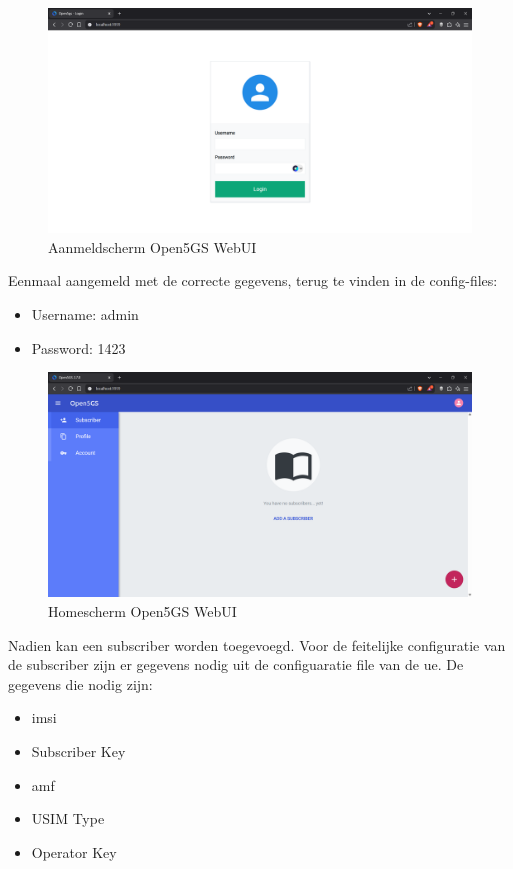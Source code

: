 \begin{figure}[h]
    \includegraphics[width=\linewidth]{../graphics/POC-WebUI-Login.png}
    \caption{Aanmeldscherm Open5GS WebUI }
    \label{fig:Aanmeld WebUI}
\end{figure}

Eenmaal aangemeld met de correcte gegevens, terug te vinden in de config-files:


\begin{itemize}
    \item Username: admin
    \item Password: 1423
\end{itemize}

\begin{figure}[h!]
    \includegraphics[width=\linewidth]{../graphics/POC-WebUI-home.png}
    \caption{Homescherm Open5GS WebUI }
    \label{fig:Home WebUI}
\end{figure}

Nadien kan een  subscriber worden toegevoegd.
Voor de feitelijke configuratie van de subscriber zijn er gegevens nodig uit de configuaratie file van de \gls{ue}. De gegevens die nodig zijn:

\begin{itemize}
    \item \gls{imsi}
    \item Subscriber Key
    \item \gls{amf}
    \item USIM Type
    \item Operator Key
\end{itemize}

